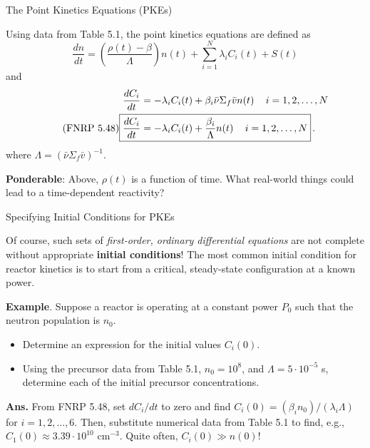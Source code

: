 \documentclass[aspectratio=1610]{beamer}
\begin{document}
\begin{frame}[fragile]{The Point Kinetics Equations (PKEs)}

Using data from Table 5.1, the point kinetics equations are defined as
\begin{equation*}
  \tag{FNRP 5.47}
  \boxed{\frac{dn}{dt} = 
     \left ( \frac{\rho(t) - \beta}{\Lambda} \right ) n(t) + 
     \sum^N_{i=1} \lambda_i C_i (t) + S(t)
  }  
\end{equation*}
and
\begin{align*}
  \frac{d C_i}{dt} &= -\lambda_i C_i(t) + \beta_i\bar{\nu} \Sigma_f \bar{v} n(t) \, \quad i = 1, 2, \ldots, N \\
  \tag{FNRP 5.48}
  \Aboxed{\frac{d C_i}{dt} &= -\lambda_i C_i(t) + \frac{\beta_i}{\Lambda} n(t) \, \quad i = 1, 2, \ldots, N } \, .
\end{align*}
where $\Lambda = (\bar{\nu}\Sigma_f \bar{v})^{-1}$. 
\vfill 

{\bf Ponderable}: Above, $\rho(t)$ is a function of time.  What real-world things could lead to a time-dependent reactivity?

\end{frame}

\begin{frame}[fragile]{Specifying Initial Conditions for PKEs}

Of course, such sets of {\it first-order, ordinary differential equations} are not complete without appropriate {\bf initial conditions}!  The most common initial condition for reactor kinetics is to start from a critical, steady-state configuration at a known power.

\vfill 

{\bf Example}. Suppose a reactor is operating at a constant power $P_0$ such that the neutron population is $n_0$.  
\begin{itemize} 
 \item Determine an expression for the initial values $C_i(0)$.
 \item Using the precursor data from Table 5.1, $n_0 = 10^{8}$, and $\Lambda = 5\cdot 10^{-5}$ s, determine each of the initial precursor concentrations.
\end{itemize}

\textcolor{wcprimary}{{\small 
{\bf Ans.} From FNRP 5.48, set $d C_i/dt$ to zero and find $C_i(0) = (\beta_i n_0)/(\lambda_i \Lambda)$ for $i = 1, 2, \ldots, 6$. 
Then, substitute numerical data from Table 5.1 to find, e.g., $C_1(0) \approx 3.39\cdot 10^{10}$ cm$^{-3}$.  Quite often, $C_i(0) \gg n(0)$!  
}}

\end{frame}
\end{document}
